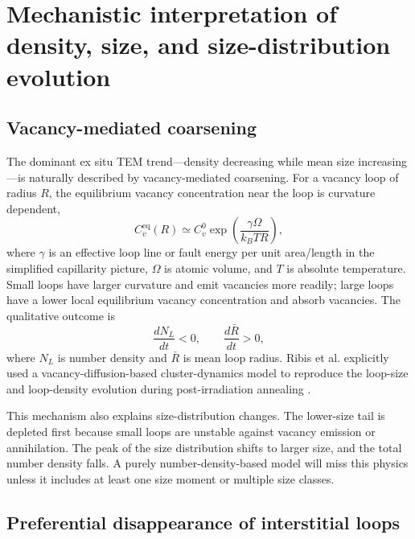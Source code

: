 \documentclass[11pt]{article}
\begin{document}
\section{Mechanistic interpretation of density, size, and size-distribution evolution}

\subsection{Vacancy-mediated coarsening}

The dominant ex situ TEM trend---density decreasing while mean size increasing---is naturally described by vacancy-mediated coarsening.  For a vacancy loop of radius $R$, the equilibrium vacancy concentration near the loop is curvature dependent,
\begin{equation}
  C_v^{\mathrm{eq}}(R) \simeq C_v^0 \exp\left(\frac{\gamma\Omega}{k_BTR}\right),
\end{equation}
where $\gamma$ is an effective loop line or fault energy per unit area/length in the simplified capillarity picture, $\Omega$ is atomic volume, and $T$ is absolute temperature.  Small loops have larger curvature and emit vacancies more readily; large loops have a lower local equilibrium vacancy concentration and absorb vacancies.  The qualitative outcome is
\begin{equation}
  \frac{dN_L}{dt}<0, \qquad \frac{d\bar{R}}{dt}>0,
\end{equation}
where $N_L$ is number density and $\bar R$ is mean loop radius.  Ribis et al. explicitly used a vacancy-diffusion-based cluster-dynamics model to reproduce the loop-size and loop-density evolution during post-irradiation annealing \citep{Ribis2010}.

This mechanism also explains size-distribution changes.  The lower-size tail is depleted first because small loops are unstable against vacancy emission or annihilation.  The peak of the size distribution shifts to larger size, and the total number density falls.  A purely number-density-based model will miss this physics unless it includes at least one size moment or multiple size classes.

\subsection{Preferential disappearance of interstitial loops}
\end{document}
